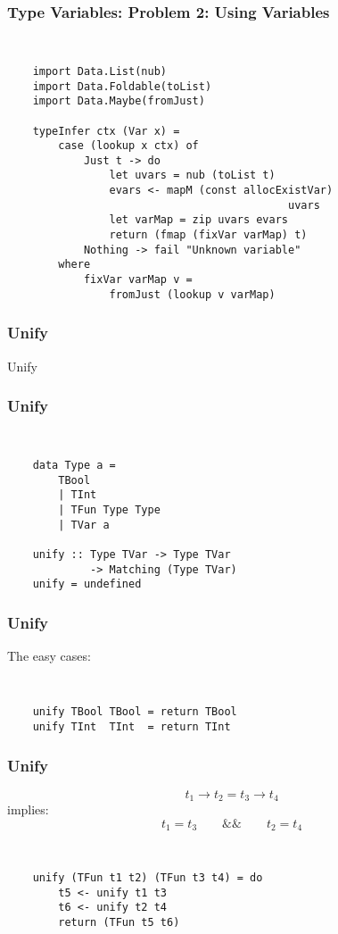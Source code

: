 \documentclass{beamer}
\begin{document}
\begin{frame}[fragile]
\frametitle{Type Variables: Problem 2: Using Variables}

{\tt
\begin{verbatim}
    import Data.List(nub)
    import Data.Foldable(toList)
    import Data.Maybe(fromJust)

    typeInfer ctx (Var x) =
        case (lookup x ctx) of
            Just t -> do
                let uvars = nub (toList t)
                evars <- mapM (const allocExistVar)
                                            uvars
                let varMap = zip uvars evars
                return (fmap (fixVar varMap) t)
            Nothing -> fail "Unknown variable"
        where
            fixVar varMap v =
                fromJust (lookup v varMap)
\end{verbatim}
}
\end{frame}

\begin{frame}
\frametitle{Unify}
\Huge{
\begin{center}
Unify
\end{center}
}
\end{frame}


\begin{frame}[fragile]
\frametitle{Unify}

\Large{\tt
\begin{verbatim}
    data Type a =
        TBool
        | TInt
        | TFun Type Type
        | TVar a

    unify :: Type TVar -> Type TVar
             -> Matching (Type TVar)
    unify = undefined
\end{verbatim}
}
\end{frame}

\begin{frame}[fragile]
\frametitle{Unify}

\Large{

The easy cases:

{\tt
\begin{verbatim}
    unify TBool TBool = return TBool
    unify TInt  TInt  = return TInt
\end{verbatim}
}}
\end{frame}

\begin{frame}[fragile]
\frametitle{Unify}
\large{
\begin{center}
$$t_1 \rightarrow{} t_2 = t_3 \rightarrow{} t_4$$
implies:
$$t_1 = t_3\qquad{}\&\&\qquad{}t_2 = t_4$$
\end{center}

{\tt
\begin{verbatim}
    unify (TFun t1 t2) (TFun t3 t4) = do
        t5 <- unify t1 t3
        t6 <- unify t2 t4
        return (TFun t5 t6)
\end{verbatim}
}}
\end{frame}
\end{document}
